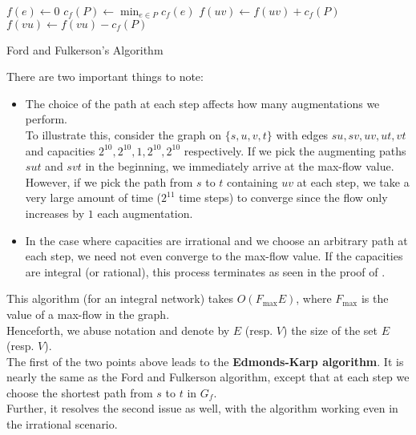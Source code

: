 			\begin{algorithm}[H]
				\DontPrintSemicolon
				\SetNoFillComment
				 {
					$f(e)\gets 0$
				}
				 {
					$c_f(P)\gets\min_{e \in P} c_f(e)$\;
					 {
						 {
							$f(uv)\gets f(uv) + c_f(P)$
						} {
							$f(vu) \gets f(vu) - c_f(P)$
						}
					}
				}
				\;
				\caption{Ford and Fulkerson's Algorithm}\label{algo: FF max flow}
			\end{algorithm}

			There are two important things to note:
			\begin{itemize}
				\item The choice of the path at each step affects how many augmentations we perform.\\
				To illustrate this, consider the graph on $\{s,u,v,t\}$ with edges $su,sv,uv,ut,vt$ and capacities $2^{10},2^{10},1,2^{10},2^{10}$ respectively. If we pick the augmenting paths $sut$ and $svt$ in the beginning, we immediately arrive at the max-flow value. However, if we pick the path from $s$ to $t$ containing $uv$ at each step, we take a very large amount of time ($2^{11}$ time steps) to converge since the flow only increases by $1$ each augmentation.

				\item In the case where capacities are irrational and we choose an arbitrary path at each step, we need not even converge to the max-flow value. If the capacities are integral (or rational), this process terminates as seen in the proof of .
			\end{itemize}

			This algorithm (for an integral network) takes $O(F_\text{max}E)$, where $F_\text{max}$ is the value of a max-flow in the graph.\\

			Henceforth, we abuse notation and denote by $E$ (resp. $V$) the size of the set $E$ (resp. $V$).\\

			The first of the two points above leads to the \textbf{Edmonds-Karp algorithm}. It is nearly the same as the Ford and Fulkerson algorithm, except that at each step we choose the shortest path from $s$ to $t$ in $G_f$. \\
			Further, it resolves the second issue as well, with the algorithm working even in the irrational scenario.

